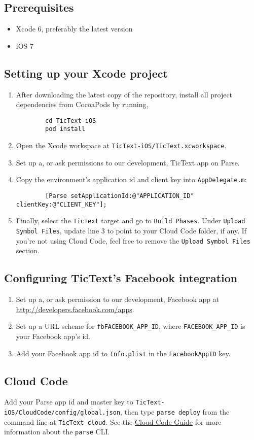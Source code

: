 \subsection{Prerequisites}
\begin{itemize}
	\item Xcode 6, preferably the latest version
	\item iOS 7
\end{itemize}

\subsection{Setting up your Xcode project}
\begin{enumerate}
	\item After downloading the latest copy of the repository, install all project dependencies from CocoaPods by running,
		\begin{verbatim}
		cd TicText-iOS
		pod install
		\end{verbatim}
	\item Open the Xcode workspace at \verb|TicText-iOS/TicText.xcworkspace|.
	\item Set up a, or ask permissions to our development, TicText app on Parse.
	\item Copy the environment's application id and client key into \verb|AppDelegate.m|:
		\begin{verbatim}
		[Parse setApplicationId:@"APPLICATION_ID" clientKey:@"CLIENT_KEY"];
		\end{verbatim}
	\item Finally, select the \verb|TicText| target and go to \verb|Build Phases|. Under \verb|Upload Symbol Files|, update line 3 to point to your Cloud Code folder, if any. If you're not using Cloud Code, feel free to remove the \verb|Upload Symbol Files| section.
\end{enumerate}

\subsection{Configuring TicText's Facebook integration}
\begin{enumerate}
	\item Set up a, or ask permission to our development, Facebook app at \url{http://developers.facebook.com/apps}.
	\item Set up a URL scheme for \verb|fbFACEBOOK_APP_ID|, where \verb|FACEBOOK_APP_ID| is your Facebook app's id.
	\item Add your Facebook app id to \verb|Info.plist| in the \verb|FacebookAppID| key.
\end{enumerate}

\subsection{Cloud Code}
Add your Parse app id and master key to \verb|TicText-iOS/CloudCode/config/global.json|, then type \verb|parse deploy| from the command line at \verb|TicText-cloud|. See the \href{https://parse.com/docs/cloud_code_guide#clt}{Cloud Code Guide} for more information about the \verb|parse| CLI.
